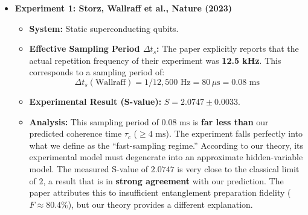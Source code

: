 \documentclass[11pt]{article}
\begin{document}
\begin{itemize}
    \item \textbf{Experiment 1: Storz, Wallraff et al., Nature (2023)}
    \begin{itemize}
        \item \textbf{System:} Static superconducting qubits.
        \item \textbf{Effective Sampling Period $\Delta t_s$:} The paper explicitly reports that the actual repetition frequency of their experiment was \textbf{12.5 kHz}. This corresponds to a sampling period of:
        \[ \Delta t_s(\text{Wallraff}) = 1 / 12,500 \text{ Hz} = 80 \, \mu\text{s} = 0.08 \text{ ms} \]
        \item \textbf{Experimental Result (S-value):} $S = 2.0747 \pm 0.0033$.
        \item \textbf{Analysis:} This sampling period of $0.08 \text{ ms}$ is \textbf{far less than} our predicted coherence time $\tau_c$ ($\geq 4 \text{ ms}$). The experiment falls perfectly into what we define as the ``fast-sampling regime.'' According to our theory, its experimental model must degenerate into an approximate hidden-variable model. The measured S-value of $2.0747$ is very close to the classical limit of $2$, a result that is in \textbf{strong agreement} with our prediction. The paper attributes this to insufficient entanglement preparation fidelity ($F\approx80.4\%$), but our theory provides a different explanation.
    \end{itemize}


\end{itemize}
\end{document}
